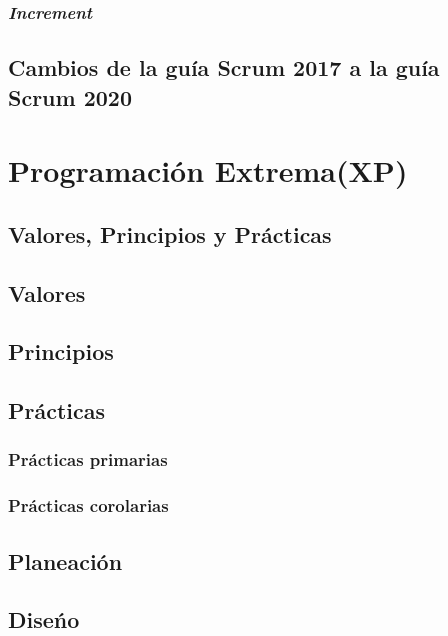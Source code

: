 \begin{spacing}{1.5}
		\subsubsection{\textit{Increment}}
					\lipsum[1]
	\subsection{Cambios de la gu\'{i}a Scrum 2017 a la gu\'{i}a Scrum 2020}
				\lipsum[1]
\section{Programaci\'{o}n Extrema(XP)}
		\lipsum[1-2]
	\subsection{Valores, Principios y Pr\'{a}cticas}
			\lipsum[1]
	\subsection{Valores}
				\lipsum[1]
	\subsection{Principios}
				\lipsum[1]
	\subsection{Pr\'{a}cticas}
				\lipsum[1]
		\subsubsection{Pr\'{a}cticas primarias}
					\lipsum[1]
		\subsubsection{Pr\'{a}cticas corolarias}
					\lipsum[1]
	\subsection{Planeaci\'{o}n}
				\lipsum[1]
	\subsection{Dise\'{n}o}
				\lipsum[1]

\end{spacing}
